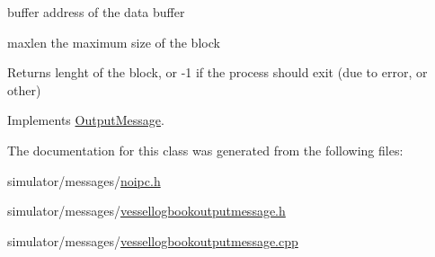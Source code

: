 \begin{DoxyItemize}
\item buffer address of the data buffer \item maxlen the maximum size of the block \begin{DoxyReturn}{Returns}
lenght of the block, or -\/1 if the process should exit (due to error, or other) 
\end{DoxyReturn}
\end{DoxyItemize}


Implements \mbox{\hyperlink{class_output_message_a42e0a2560b1bf9e58b6626056f87b8c2}{Output\+Message}}.



The documentation for this class was generated from the following files\+:\begin{DoxyCompactItemize}
\item 
simulator/messages/\mbox{\hyperlink{noipc_8h}{noipc.\+h}}\item 
simulator/messages/\mbox{\hyperlink{vessellogbookoutputmessage_8h}{vessellogbookoutputmessage.\+h}}\item 
simulator/messages/\mbox{\hyperlink{vessellogbookoutputmessage_8cpp}{vessellogbookoutputmessage.\+cpp}}\end{DoxyCompactItemize}
